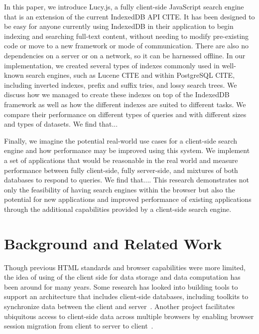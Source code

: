 \documentclass{vldb}
\begin{document}
In this paper, we introduce Lucy.js, a fully client-side JavaScript search engine that is an extension of the current IndexedDB API CITE. It has been designed to be easy for anyone currently using IndexedDB in their application to begin indexing and searching full-text content, without needing to modify pre-existing code or move to a new framework or mode of communication. There are also no dependencies on a server or on a network, so it can be harnessed offline. In our implementation, we created several types of indexes commonly used in well-known search engines, such as Lucene CITE and within PostgreSQL CITE, including inverted indexes, prefix and suffix tries, and lossy search trees. We discuss how we managed to create these indexes on top of the IndexedDB framework as well as how the different indexes are suited to different tasks. We compare their performance on different types of queries and with different sizes and types of datasets. We find that...

Finally, we imagine the potential real-world use cases for a client-side search engine and how performance may be improved using this system. We implement a set of applications that would be reasonable in the real world and measure performance between fully client-side, fully server-side, and mixtures of both databases to respond to queries. We find that....
This research demonstrates not only the feasibility of having search engines within the browser but also the potential for new applications and improved performance of existing applications through the additional capabilities provided by a client-side search engine.


\section{Background and Related Work}

Though previous HTML standards and browser capabilities were more limited, the idea of using of the client side for data storage and data computation has been around for many years. 
Some research has looked into building tools to support an architecture that includes client-side databases, including toolkits to synchronize data between the client and server~\cite{benson2010sync}. Another project facilitates ubiquitous access to client-side data across multiple browsers by enabling browser session migration from client to server to client~\cite{lo2013imagen}. 
\end{document}
